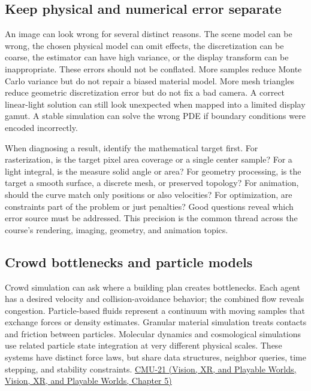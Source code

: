 \subsection{Keep physical and numerical error separate}\label{04-visual-computing-ii-ch029-keep-physical-and-numerical-error-separate}

An image can look wrong for several distinct reasons. The scene model can be wrong, the chosen physical model can omit effects, the discretization can be coarse, the estimator can have high variance, or the display transform can be inappropriate. These errors should not be conflated. More samples reduce Monte Carlo variance but do not repair a biased material model. More mesh triangles reduce geometric discretization error but do not fix a bad camera. A correct linear-light solution can still look unexpected when mapped into a limited display gamut. A stable simulation can solve the wrong PDE if boundary conditions were encoded incorrectly.

When diagnosing a result, identify the mathematical target first. For rasterization, is the target pixel area coverage or a single center sample? For a light integral, is the measure solid angle or area? For geometry processing, is the target a smooth surface, a discrete mesh, or preserved topology? For animation, should the curve match only positions or also velocities? For optimization, are constraints part of the problem or just penalties? Good questions reveal which error source must be addressed. This precision is the common thread across the course's rendering, imaging, geometry, and animation topics.

\subsection{Crowd bottlenecks and particle models}\label{04-visual-computing-ii-ch029-crowd-bottlenecks-and-particle-models}

Crowd simulation can ask where a building plan creates bottlenecks. Each agent has a desired velocity and collision-avoidance behavior; the combined flow reveals congestion. Particle-based fluids represent a continuum with moving samples that exchange forces or density estimates. Granular material simulation treats contacts and friction between particles. Molecular dynamics and cosmological simulations use related particle state integration at very different physical scales. These systems have distinct force laws, but share data structures, neighbor queries, time stepping, and stability constraints. \href{../07-Vision-XR-and-Playable-Worlds/main.pdf\#nameddest=04-visual-computing-ii-ch036-cmu-21---dynamics-and-time-integration}{CMU-21 (Vision, XR, and Playable Worlds, Vision, XR, and Playable Worlds, Chapter 5)}

